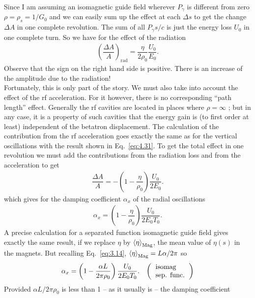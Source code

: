 Since I am assuming an isomagnetic guide field wherever $P_\gamma$ is different from zero $\rho = \rho_s = 1/G_0$ and we can easily sum up the effect at each $\Delta s$ to get the change $\Delta A$ in one complete revolution. The sum of all $P_\gamma s/c$ is just the energy loss $U_0$ in one complete turn. So we have for the effect of the radiation
\begin{align}
	\left( \dfrac{\Delta A}{A} \right)_\text{rad} = \dfrac{\eta}{2\rho_0}\dfrac{U_0}{E_0}.
\end{align}
Observe that the sign on the right hand side is positive. There is an increase of the amplitude
 due to the radiation!\\
Fortunately, this is only part of the story. We must also take into account the effect of the rf acceleration. For it however, there is no corresponding ``path length'' effect. Generally the rf cavities are located in places where $\rho = \infty$ ; but in any case, it is a property of such cavities that the energy gain is (to first order at least) independent of the betatron displacement. The calculation of the contribution from the rf acceleration goes exactly the same as for the vertical oscillations with the result shown in Eq.~\eqref{eq:4.31}. To get the total effect in one revolution we must add the contributions from the radiation loss and from the acceleration to get
\begin{align}
	\dfrac{\Delta A}{A} = - \left(1 - \dfrac{\eta}{\rho_0} \right) \dfrac{U_0}{2 E_0}.
\end{align}
which gives for the damping coefficient $\alpha_x$ of the radial oscillations
\begin{align}\label{eq:4.48}
	\alpha_x = \left(1 - \dfrac{\eta}{\rho_0} \right) \dfrac{U_0}{2 E_0 T_0}.
\end{align}
A precise calculation for a separated function isomagnetic guide field gives exactly the same result, if we replace $\eta$ by $\left< \eta \right>_\text{Mag}$, the mean value of $\eta(s)$ in the magnets. But recalling Eq.~\eqref{eq:3.14}, $\left< \eta \right>_\text{Mag} = L\alpha/2\pi$ so
\begin{align} \label{eq:4.49}
	\alpha_x = \left(1 - \dfrac{\alpha L}{2\pi\rho_0} \right) \dfrac{U_0}{2 E_0 T_0}. && \left(\begin{tabular}{l}
\text{isomag} \\
\text{sep. func.}
\end{tabular}\right)
\end{align}
Provided $\alpha L/2\pi\rho_0$ is less than 1 -- as it usually is -- the damping coefficient
